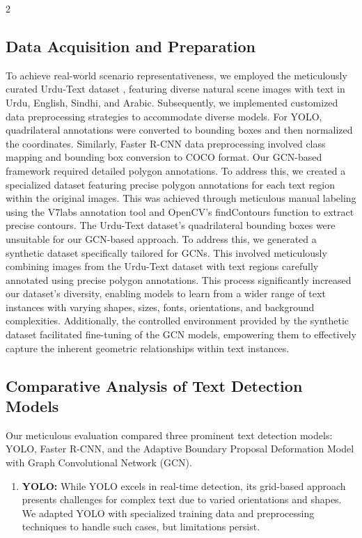 \documentclass[sn-mathphys,Numbered]{sn-jnl}%
\begin{document}
\begin{multicols}{2}
\subsection{Data Acquisition and Preparation}
To achieve real-world scenario representativeness, we employed the meticulously curated Urdu-Text dataset \cite{urcutext}, featuring diverse natural scene images with text in Urdu, English, Sindhi, and Arabic. Subsequently, we implemented customized data preprocessing strategies to accommodate diverse models.
For YOLO, quadrilateral annotations were converted to bounding boxes and then normalized the coordinates. Similarly, Faster R-CNN data preprocessing involved class mapping and bounding box conversion to COCO format. Our GCN-based framework required detailed polygon annotations. To address this, we created a specialized dataset featuring precise polygon annotations for each text region within the original images. This was achieved through meticulous manual labeling using the V7labs annotation tool and OpenCV's findContours function to extract precise contours.
The Urdu-Text dataset's quadrilateral bounding boxes were unsuitable for our GCN-based approach. To address this, we generated a synthetic dataset specifically tailored for GCNs. This involved meticulously combining images from the Urdu-Text dataset with text regions carefully annotated using precise polygon annotations. This process significantly increased our dataset's diversity, enabling models to learn from a wider range of text instances with varying shapes, sizes, fonts, orientations, and background complexities. Additionally, the controlled environment provided by the synthetic dataset facilitated fine-tuning of the GCN models, empowering them to effectively capture the inherent geometric relationships within text instances.

\subsection{Comparative Analysis of Text Detection Models}
Our meticulous evaluation compared three prominent text detection models: YOLO, Faster R-CNN, and the Adaptive Boundary Proposal Deformation Model with Graph Convolutional Network (GCN).

\begin{enumerate}
	\item \textbf{YOLO:} While YOLO excels in real-time detection, its grid-based approach presents challenges for complex text due to varied orientations and shapes. We adapted YOLO with specialized training data and preprocessing techniques to handle such cases, but limitations persist.


\end{enumerate}
\end{multicols}
\end{document}
